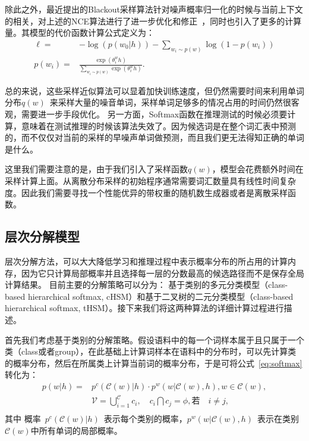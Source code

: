 除此之外，最近提出的Blackout采样算法针对噪声概率归一化的时候与当前上下文的相关，对上述的NCE算法进行了进一步优化和修正~，同时也引入了更多的计算量。其模型的代价函数计算公式定义为：
\begin{equation}
\begin{split}
  \ell=&-\log(p(w_0|h)) - \sum_{w_i \sim p(w)} \log(1 - p(w_i))\\
p(w_i) =& \frac{\exp(\theta^w_i h)}{\sum_{w_i \sim p(w)} \exp(\theta^w_i h)}.
\end{split}
\end{equation}

总的来说，这些采样近似算法可以显着加快训练速度，但仍然需要时间来利用单词分布$q(w)$~来采样大量的噪音单词，采样单词足够多的情况占用的时间仍然很客观，需要进一步手段优化。 另一方面，Softmax函数在推理测试的时候必须要计算，意味着在测试推理的时候该算法失效了。因为候选词是在整个词汇表中预测的，而不仅仅对当前的采样的早噪声单词做预测，而且我们更无法得知正确的单词是什么。

这里我们需要注意的是，由于我们引入了采样函数$q(w)$，模型会花费额外时间在采样计算上面。从离散分布采样的初始程序通常需要词汇数量具有线性时间复杂度。因此我们需要寻找一个性能优异的带权重的随机数生成器或者是离散采样函数。


\subsection{层次分解模型}
层次分解方法，可以大大降低学习和推理过程中表示概率分布的所占用的计算内存，因为它只计算局部概率并且选择每一层的分数最高的候选路径而不是保存全局计算结果。
目前主要的分解策略可以分为： 基于类别的多元分类模型（class-based hierarchical softmax, cHSM）和基于二叉树的二元分类模型（class-based hierarchical softmax, tHSM）。接下来我们将这两种算法的详细计算过程进行描述。

首先我们考虑基于类别的分解策略。假设语料中的每一个词样本属于且只属于一个类（class或者group），在此基础上计算词样本在语料中的分布时，可以先计算类的概率分布，然后在所属类上计算当前词的概率分布，于是可将公式~\ref{eq:softmax} 转化为：
  \begin{equation}
  \begin{split}
p(w|h)=&p^c(\mathcal{C}(w)|h)\cdot p^w(w|\mathcal{C}(w),h) , w\in \mathcal{C}(w),\\
&\mathcal{V}=\bigcup _{i = 1}^\mathcal{C}{c_i},\quad  c_i \bigcap c_j=\phi, \text{若}\quad i\ne j, \\
\end{split}
\end{equation}
其中 概率~$p^c(\mathcal{C}(w)|h)$~表示每个类别的概率，$p^w(w|\mathcal{C}(w),h)$~表示在类别$\mathcal{C}(w)$中所有单词的局部概率。

